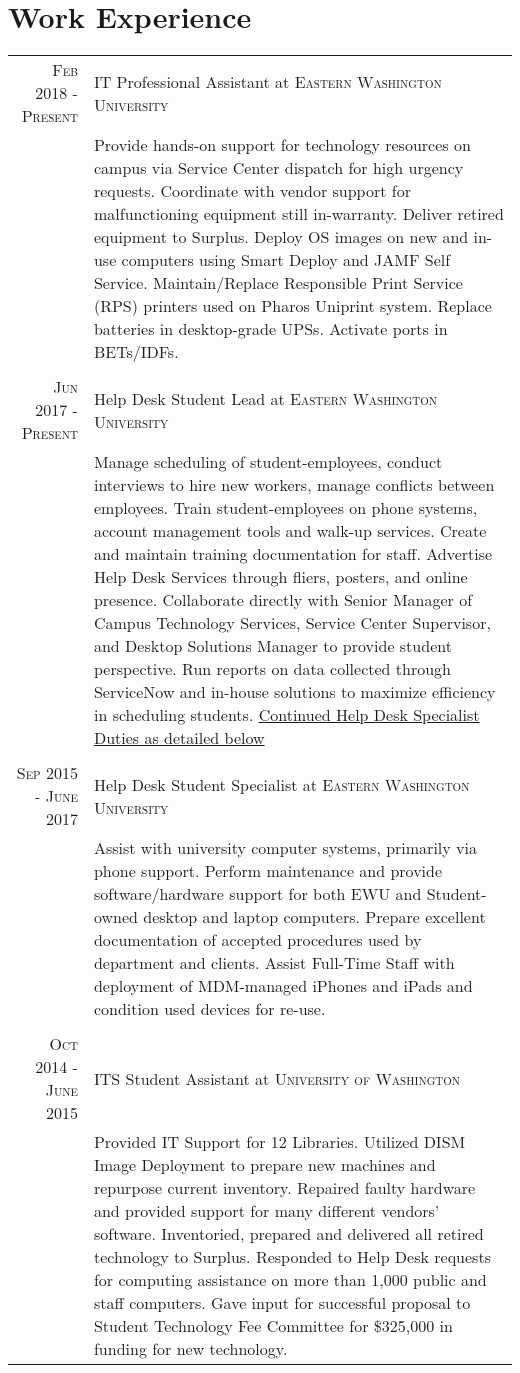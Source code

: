 \documentclass[a4paper,10pt]{article}
\begin{document}
\section{Work Experience}
\begin{tabular}{r|p{14cm}}
\textsc{Feb 2018 - Present} & IT Professional Assistant at \textsc{Eastern Washington University}\\
&\footnotesize{Provide hands-on support for technology resources on campus via Service Center dispatch for high urgency requests. Coordinate with vendor support for malfunctioning equipment still in-warranty. Deliver retired equipment to Surplus. Deploy OS images on new and in-use computers using Smart Deploy and JAMF Self Service. Maintain/Replace Responsible Print Service (RPS) printers used on Pharos Uniprint system. Replace batteries in desktop-grade UPSs. Activate ports in BETs/IDFs.}\\\multicolumn{2}{c}{} \\
 \textsc{Jun 2017 - Present} & Help Desk Student Lead at \textsc{Eastern Washington University} \\
&\footnotesize{Manage scheduling of student-employees, conduct interviews to hire new workers, manage conflicts between employees. Train student-employees on phone systems, account management tools and walk-up services. Create and maintain training documentation for staff. Advertise Help Desk Services through fliers, posters, and online presence. Collaborate directly with Senior Manager of Campus Technology Services, Service Center Supervisor, and Desktop Solutions Manager to provide student perspective. Run reports on data collected through ServiceNow and in-house solutions to maximize efficiency in scheduling students.} \underline{Continued Help Desk Specialist Duties as detailed below}\\\multicolumn{2}{c}{} \\
\textsc{Sep 2015 - June 2017} & Help Desk Student Specialist at \textsc{Eastern Washington University}\\
& \footnotesize{Assist with university computer systems, primarily via phone support. Perform maintenance and provide software/hardware support for both EWU and Student-owned desktop and laptop computers. Prepare excellent documentation of accepted procedures used by department and clients. Assist Full-Time Staff with deployment of MDM-managed iPhones and iPads and condition used devices for re-use.}\\\multicolumn{2}{c}{}\\
\textsc{Oct 2014 - June 2015} & ITS Student Assistant at \textsc{University of Washington}\\
& \footnotesize{Provided IT Support for 12 Libraries. Utilized DISM Image Deployment to prepare new machines and repurpose current inventory. Repaired faulty hardware and provided support for many different vendors’ software. Inventoried, prepared and delivered all retired technology to Surplus. Responded to Help Desk requests for computing assistance on more than 1,000 public and staff computers. Gave input for successful proposal to Student Technology Fee Committee for \$325,000 in funding for new technology.}
\end{tabular}
\end{document}
